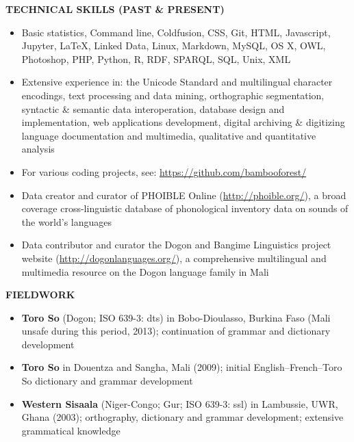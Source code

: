 \documentclass[11pt]{article}
\begin{document}
\vskip 24pt
\begin{flushleft}
{\bf TECHNICAL SKILLS (PAST \& PRESENT)}
\end{flushleft}
\begin{itemize}
\item Basic statistics, Command line, Coldfusion, CSS, Git, HTML, Javascript, Jupyter, \LaTeX, Linked Data, Linux, Markdown, MySQL, OS X, OWL, Photoshop, PHP, Python, R, RDF, SPARQL, SQL, Unix, XML
\item Extensive experience in: the Unicode Standard and multilingual character encodings, text processing and data mining, orthographic segmentation, syntactic \& semantic data interoperation, database design and implementation, web applications development, digital archiving \& digitizing language documentation and multimedia, qualitative and quantitative analysis
\item For various coding projects, see: \url{https://github.com/bambooforest/}
\item Data creator and curator of PHOIBLE Online (\url{http://phoible.org/}), a broad coverage cross-linguistic database of phonological inventory data on sounds of the world's languages
\item Data contributor and curator the Dogon and Bangime Linguistics project website (\url{http://dogonlanguages.org/}), a comprehensive multilingual and multimedia resource on the Dogon language family in Mali
\end{itemize}

\vskip 10pt
\begin{flushleft}
{\bf FIELDWORK}
\end{flushleft}
\begin{itemize}
\item {\bf Toro So} (Dogon; ISO 639-3: dts) in Bobo-Dioulasso, Burkina Faso (Mali unsafe during this period, 2013); continuation of grammar and dictionary development
\item {\bf Toro So} in Douentza and Sangha, Mali (2009); initial English--French--Toro So dictionary and grammar development
\item {\bf Western Sisaala} (Niger-Congo; Gur; ISO 639-3: ssl) in Lambussie, UWR, Ghana (2003); orthography, dictionary and grammar development; extensive grammatical knowledge
\end{itemize}
\end{document}
